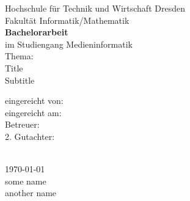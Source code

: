 \thispagestyle{empty}
\begin{titlepage}
	\begin{center}
		\vspace*{1cm}
		\large Hochschule für Technik und Wirtschaft Dresden\\
		\vspace*{0.5cm}
		\large Fakultät Informatik/Mathematik\\
		\vspace*{4.3cm}
		\Huge\textbf{Bachelorarbeit}\\
		\vspace*{1.8cm}
		\large{im Studiengang Medieninformatik}\\
	\vspace*{3.0cm}
		\Large{Thema:}\\
		\Large{Title}\\
		\vspace*{0.6cm}
		\Large{Subtitle}
		\vfill
		\large{
		\begin{multicols}{2}
			\begin{flushright}
				eingereicht von: \\
				eingereicht am: \\
				Betreuer: \\
				2. Gutachter: \\
			\end{flushright}
			\columnbreak
			\begin{flushleft}
				\authorname\\
				\today\\
				some name\\
				another name\\
			\end{flushleft}
		\end{multicols}
	}
	\end{center}
%
\end{titlepage}
